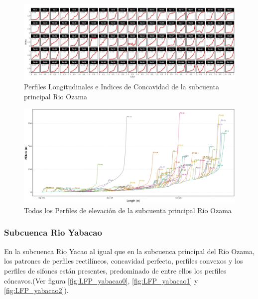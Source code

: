 \documentclass[11pt,]{article}
\begin{document}
\begin{figure}
\centering
\includegraphics[width=1.00000\textwidth]{Productos Generados/perfiles_adimensionales_indices_de_concavidad.jpeg}
\caption{\label{fig:LFP_Ozama1} Perfiles Longitudinales e Indices de
Concavidad de la subcuenta principal Rio Ozama}
\end{figure}

\begin{figure}
\centering
\includegraphics[width=1.00000\textwidth]{Productos Generados/perfiles_todos_juntos.jpeg}
\caption{\label{fig:LFP_Ozama2} Todos los Perfiles de elevación de la
subcuenta principal Rio Ozama}
\end{figure}

\newpage

\subsubsection{Subcuenca Rio Yabacao}\label{subcuenca-rio-yabacao}

En la subcuenca Rio Yacao al igual que en la subcuenca principal del Rio
Ozama, los patrones de perfiles rectilíneos, concavidad perfecta,
perfiles convexos y los perfiles de sifones están presentes, predominado
de entre ellos los perfiles cóncavos.(Ver figura \ref{fig:LFP_yabacao0},
\ref{fig:LFP_yabacao1} y \ref{fig:LFP_yabacao2}).
\end{document}
